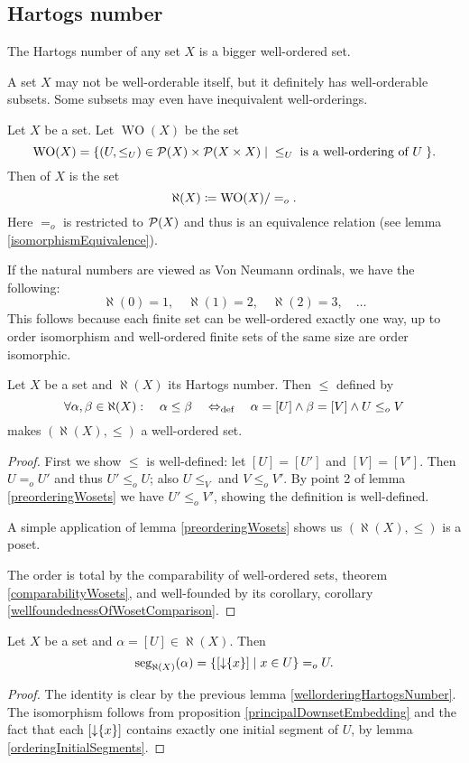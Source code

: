 \subsection{Hartogs number}
The Hartogs number of any set $X$ is a bigger well-ordered set.

A set $X$ may not be well-orderable itself, but it definitely has well-orderable subsets. Some subsets may even have inequivalent well-orderings.
\begin{definition}
Let $X$ be a set. Let $\operatorname{WO}(X)$ be the set
\[ \operatorname{WO}(X) = \{ (U,\leq_U) \in \operatorname{\mathcal{P}}(X)\times\operatorname{\mathcal{P}}(X\times X) \;|\; \leq_U\; \text{is a well-ordering of $U$}\;  \}. \]
Then  of $X$ is the set
\[ \aleph(X) \coloneqq \operatorname{WO}(X)/=_o. \]
Here $=_o$ is restricted to $\operatorname{\mathcal{P}}(X)$ and thus is an equivalence relation (see lemma \ref{isomorphismEquivalence}).
\end{definition}
If the natural numbers are viewed as Von Neumann ordinals, we have the following:
\[ \aleph(0) = 1, \quad \aleph(1) = 2, \quad \aleph(2) = 3, \quad \ldots \]
This follows because each finite set can be well-ordered exactly one way, up to order isomorphism and well-ordered finite sets of the same size are order isomorphic.

\begin{lemma} \label{wellorderingHartogsNumber}
Let $X$ be a set and $\aleph(X)$ its Hartogs number. Then $\leq$ defined by
\[ \forall \alpha, \beta \in \aleph(X):\quad \alpha \leq \beta \quad\Leftrightarrow_{\text{def}}\quad \alpha = [U] \land \beta = [V] \land U\leq_o V \]
makes $(\aleph(X), \leq)$ a well-ordered set.
\end{lemma}
\begin{proof}
First we show $\leq$ is well-defined: let $[U] = [U']$ and $[V] = [V']$. Then $U =_o U'$ and thus $U'\leq_o U$; also $U \leq_V$ and $V\leq_o V'$. By point 2 of lemma \ref{preorderingWosets} we have $U' \leq_o V'$, showing the definition is well-defined.

A simple application of lemma \ref{preorderingWosets} shows us $(\aleph(X), \leq)$ is a poset.

The order is total by the comparability of well-ordered sets, theorem \ref{comparabilityWosets}, and well-founded by its corollary, corollary \ref{wellfoundednessOfWosetComparison}.
\end{proof}

\begin{lemma} \label{HartogsNumberAsOrdinal}
Let $X$ be a set and $\alpha = [U] \in \aleph(X)$. Then
\[ \operatorname{seg}_{\aleph(X)}(\alpha) = \{ [\operatorname{\downarrow}\{x\}] \;|\; x\in U \} =_o U. \]
\end{lemma}
\begin{proof}
The identity is clear by the previous lemma \ref{wellorderingHartogsNumber}. The isomorphism follows from proposition \ref{principalDownsetEmbedding} and the fact that each $[\operatorname{\downarrow}\{x\}]$ contains exactly one initial segment of $U$, by lemma \ref{orderingInitialSegments}.
\end{proof}


